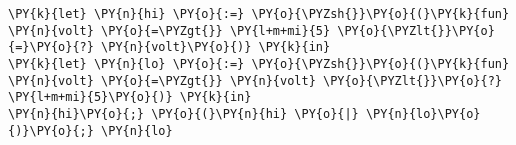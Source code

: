 \begin{Verbatim}[commandchars=\\\{\}]
\PY{k}{let} \PY{n}{hi} \PY{o}{:=} \PY{o}{\PYZsh{}}\PY{o}{(}\PY{k}{fun} \PY{n}{volt} \PY{o}{=\PYZgt{}} \PY{l+m+mi}{5} \PY{o}{\PYZlt{}}\PY{o}{=}\PY{o}{?} \PY{n}{volt}\PY{o}{)} \PY{k}{in}
\PY{k}{let} \PY{n}{lo} \PY{o}{:=} \PY{o}{\PYZsh{}}\PY{o}{(}\PY{k}{fun} \PY{n}{volt} \PY{o}{=\PYZgt{}} \PY{n}{volt} \PY{o}{\PYZlt{}}\PY{o}{?} \PY{l+m+mi}{5}\PY{o}{)} \PY{k}{in}
\PY{n}{hi}\PY{o}{;} \PY{o}{(}\PY{n}{hi} \PY{o}{|} \PY{n}{lo}\PY{o}{)}\PY{o}{;} \PY{n}{lo}
\end{Verbatim}
